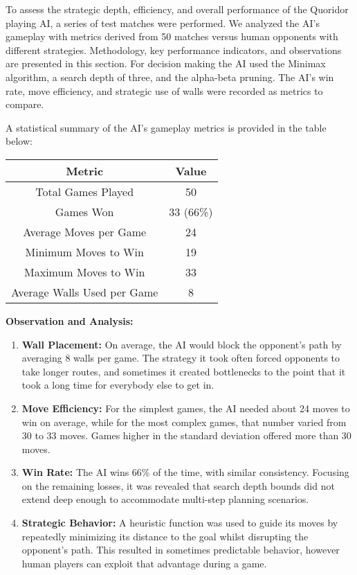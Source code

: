 \documentclass[12pt]{report}
\begin{document}
To assess the strategic depth, efficiency, and overall performance of the Quoridor playing AI, a series of test matches were performed. We analyzed the AI’s gameplay with metrics derived from 50 matches versus human opponents with different strategies. Methodology, key performance indicators, and observations are presented in this section. For decision making the AI used the Minimax algorithm, a search depth of three, and the alpha-beta pruning. The AI's win rate, move efficiency, and strategic use of walls were recorded as metrics to compare.

A statistical summary of the AI's gameplay metrics is provided in the table below:
\begin{table}[ht]
  \centering
  \begin{tabular}{|c|c|}
    \hline
    \textbf{Metric} & \textbf{Value} \\
    \hline
    Total Games Played & 50 \\
    \hline
    Games Won & 33 (66\%) \\
    \hline
    Average Moves per Game & 24 \\
    \hline
    Minimum Moves to Win & 19 \\
    \hline
    Maximum Moves to Win & 33 \\
    \hline
    Average Walls Used per Game & 8 \\
    \hline
  \end{tabular}
\end{table}

\textbf{Observation and Analysis:}

\begin{enumerate}
  \item \textbf{Wall Placement:}
  On average, the AI would block the opponent’s path by averaging 8 walls per game. The strategy it took often forced opponents to take longer routes, and sometimes it created bottlenecks to the point that it took a long time for everybody else to get in.

  \item \textbf{Move Efficiency:}
  For the simplest games, the AI needed about 24 moves to win on average, while for the most complex games, that number varied from 30 to 33 moves. Games higher in the standard deviation offered more than 30 moves.

  \item \textbf{Win Rate:}
  The AI wins 66\% of the time, with similar consistency. Focusing on the remaining losses, it was revealed that search depth bounds did not extend deep enough to accommodate multi-step planning scenarios.

  \item \textbf{Strategic Behavior:}
  A heuristic function was used to guide its moves by repeatedly minimizing its distance to the goal whilst disrupting the opponent’s path. This resulted in sometimes predictable behavior, however human players can exploit that advantage during a game.
\end{enumerate}
\end{document}
